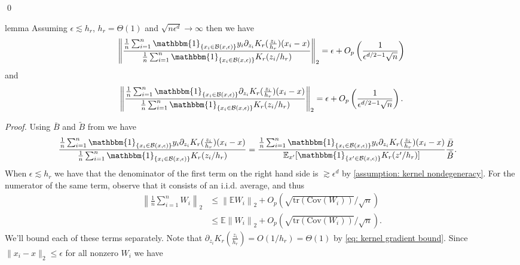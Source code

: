 \documentclass[11pt]{article}
\begin{document}
\qed{}

\begin{restatable}{lemma}{} \label{lemma: psi asymptotics}
    Assuming $\epsilon \lesssim h_r$, $h_r = \Theta(1)$ and $\sqrt{n\epsilon^d}\rightarrow \infty$ then we have \begin{align}
    \left\|\frac{\frac{1}{n}\sum_{i = 1}^n\mathbbm{1}_{\{x_i \in \mathcal{B}(x, \epsilon)\}}y_i\partial_{z_i}K_r(\frac{z_i}{h_r})(x_i - x)}{\frac{1}{n}\sum_{i = 1}^n\mathbbm{1}_{\{x_i \in \mathcal{B}(x, \epsilon)\}}K_r(z_i/h_r)}\right\|_2 = \epsilon + O_p\left(\frac{1}{\epsilon^{d/2-1}\sqrt{n}}\right)
    \end{align}
    and 
    \begin{align}
    \left\|\frac{\frac{1}{n}\sum_{i = 1}^n\mathbbm{1}_{\{x_i \in \mathcal{B}(x, \epsilon)\}}\partial_{z_i}K_r(\frac{z_i}{h_r})(x_i - x)}{\frac{1}{n}\sum_{i = 1}^n\mathbbm{1}_{\{x_i \in \mathcal{B}(x, \epsilon)\}}K_r(z_i/h_r)}\right\|_2 = \epsilon + O_p\left(\frac{1}{\epsilon^{d/2-1}\sqrt{n}}\right).
    \end{align}
\end{restatable}
\noindent \textit{Proof.} Using $\bar{B}$ and $\tilde{B}$ from  we have
\begin{align}
    \frac{\frac{1}{n}\sum_{i = 1}^n\mathbbm{1}_{\{x_i \in \mathcal{B}(x, \epsilon)\}}y_i\partial_{z_i}K_r(\frac{z_i}{h_r})(x_i - x)}{\frac{1}{n}\sum_{i = 1}^n\mathbbm{1}_{\{x_i \in \mathcal{B}(x, \epsilon)\}}K_r(z_i/h_r)} &= \frac{\frac{1}{n}\sum_{i = 1}^n\mathbbm{1}_{\{x_i \in \mathcal{B}(x, \epsilon)\}}y_i\partial_{z_i}K_r(\frac{z_i}{h_r})(x_i - x)}{\mathbb{E}_{x'}[\mathbbm{1}_{\{x' \in \mathcal{B}(x, \epsilon)\}}K_r(z'/h_r)]}\frac{\bar{B}}{\tilde{B}}. 
\end{align}
When $\epsilon \lesssim h_r$ we have that the denominator of the first term on the right hand side is $\gtrsim \epsilon^d$ by \cref{assumption: kernel nondegeneracy}. For the numerator of the same term, observe that it consists of an i.i.d. average, and thus
\begin{align}
    \left\|\frac{1}{n}\sum_{i = 1}^nW_i\right\|_2 &\leq \left\|\mathbb{E}W_i\right\|_2 + O_p\left(\sqrt{\text{tr}(\text{Cov}(W_i))}/\sqrt{n}\right) \\
    &\leq \mathbb{E}\left\|W_i\right\|_2 + O_p\left(\sqrt{\text{tr}(\text{Cov}(W_i))}/\sqrt{n}\right). \label{eq: W_i bound}
\end{align}
We'll bound each of these terms separately. Note that $\partial_{z_i}K_r(\frac{z_i}{h_r}) = O(1/h_r) = \Theta(1)$ by \cref{eq: kernel gradient bound}. Since $\|x_i - x\|_2 \leq \epsilon$ for all nonzero $W_i$ we have
\end{document}
